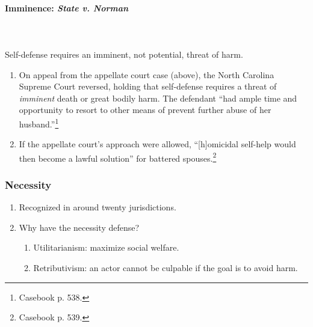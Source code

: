 \paragraph{Imminence: \emph{State v. Norman}}
~\\\\
Self-defense requires an imminent, not potential, threat of harm.

\begin{enumerate}
     \item On appeal from the appellate court case (above), the North Carolina 
     Supreme Court reversed, holding that self-defense requires a threat of 
     \emph{imminent} death or great bodily harm. The defendant ``had ample 
     time and opportunity to resort to other means of prevent further abuse of 
     her husband.''\footnote{Casebook p. 538.}
     \item If the appellate court's approach were allowed, ``[h]omicidal 
     self-help would then become a lawful solution'' for battered 
     spouses.\footnote{Casebook p. 539.}
\end{enumerate}

\subsubsection{Necessity}

\begin{enumerate}
    \item Recognized in around twenty jurisdictions.
    \item Why have the necessity defense?
    \begin{enumerate}
        \item Utilitarianism: maximize social welfare.
        \item Retributivism: an actor cannot be culpable if the goal is to 
        avoid harm.
    \end{enumerate}
\end{enumerate}

